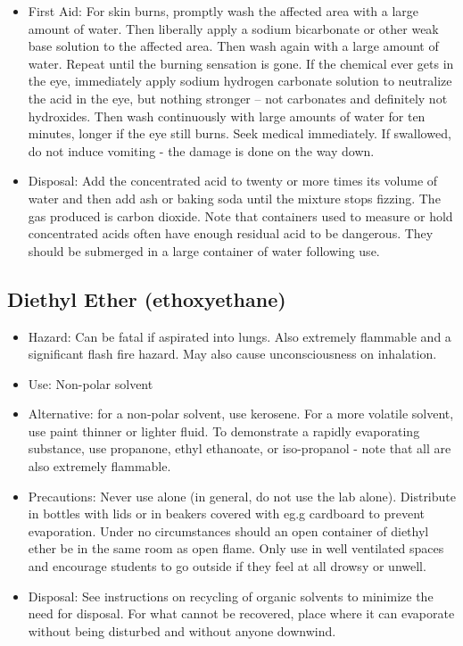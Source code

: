 \begin{itemize}
\item{First Aid: For skin burns, promptly wash the affected area 
with a large amount of water. 
Then liberally apply a sodium bicarbonate 
or other weak base solution to the affected area. 
Then wash again with a large amount of water. 
Repeat until the burning sensation is gone. 
If the chemical ever gets in the eye, 
immediately apply sodium hydrogen carbonate solution 
to neutralize the acid in the eye, but nothing stronger -- 
not carbonates and definitely not hydroxides. 
Then wash continuously with large amounts of water for ten minutes, 
longer if the eye still burns. 
Seek medical immediately. 
If swallowed, do not induce vomiting - 
the damage is done on the way down.}

\item{Disposal: Add the concentrated acid to twenty or more 
times its volume of water and then add ash or baking soda 
until the mixture stops fizzing. 
The gas produced is carbon dioxide. 
Note that containers used to measure or hold concentrated acids 
often have enough residual acid to be dangerous. 
They should be submerged in a large container of water following use.}

\end{itemize}

\subsection{Diethyl Ether (ethoxyethane)}

\begin{itemize}

\item{Hazard: Can be fatal if aspirated into lungs. 
Also extremely flammable and a significant flash fire hazard. 
May also cause unconsciousness on inhalation.}

\item{Use: Non-polar solvent}

\item{Alternative: for a non-polar solvent, use kerosene. 
For a more volatile solvent, use paint thinner or lighter fluid. 
To demonstrate a rapidly evaporating substance, 
use propanone, ethyl ethanoate, or iso-propanol - 
note that all are also extremely flammable.}

\item{Precautions: Never use alone (in general, do not use the lab alone). 
Distribute in bottles with lids 
or in beakers covered with eg.g cardboard to prevent evaporation. 
Under no circumstances should an open container of diethyl ether 
be in the same room as open flame. 
Only use in well ventilated spaces and encourage students to go outside 
if they feel at all drowsy or unwell.}

\item{Disposal: See instructions on recycling of organic solvents 
to minimize the need for disposal. 
For what cannot be recovered, 
place where it can evaporate without being disturbed 
and without anyone downwind.}

\end{itemize}


